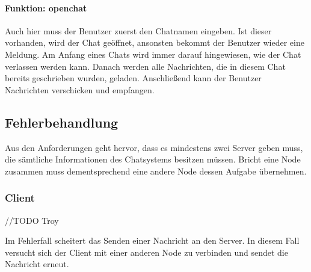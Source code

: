 \paragraph{Funktion: openchat}
Auch hier muss der Benutzer zuerst den Chatnamen eingeben. Ist dieser vorhanden, wird der Chat geöffnet, ansonsten
bekommt der Benutzer wieder eine Meldung. Am Anfang eines Chats wird immer darauf hingewiesen, wie der Chat
verlassen werden kann. Danach werden alle Nachrichten, die in diesem Chat bereits geschrieben wurden, geladen.
Anschließend kann der Benutzer Nachrichten verschicken und empfangen.

\subsection{Fehlerbehandlung}
Aus den Anforderungen geht hervor, dass es mindestens zwei Server geben muss, die sämtliche Informationen des
Chatsystems besitzen müssen. Bricht eine Node zusammen muss dementsprechend eine andere Node dessen Aufgabe übernehmen.
\subsubsection{Client}
//TODO Troy

Im Fehlerfall scheitert das Senden einer Nachricht an den Server. In diesem Fall versucht sich der Client mit
einer anderen Node zu verbinden und sendet die Nachricht erneut.

